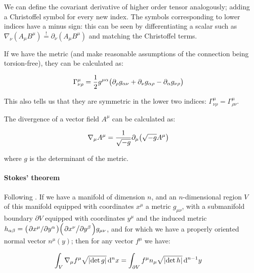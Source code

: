 \documentclass[main.tex]{subfiles}
\begin{document}
We can define the covariant derivative of higher order tensor analogously; adding a Christoffel symbol for every new index. The symbols corresponding to lower indices have a minus sign: this can be seen by differentiating a scalar such as \(\nabla_\nu (A_\mu B^\mu) \overset{!}{=}  \partial_\nu (A_\mu B^\mu)\) and matching the Christoffel terms.

If we have the metric (and make reasonable assumptions of the connection being torsion-free), they can be calculated as:

\begin{equation}
    \Gamma^\mu_{\nu \rho} = \frac{1}{2} g^{\mu \alpha} \qty(
    \partial_\rho g_{\alpha \nu} +
    \partial_\nu g_{\alpha \rho} -
    \partial_\alpha g_{\nu \rho}
    ) \label{eq:christoffel-symbols-from-metric}
\end{equation}

This also tells us that they are symmetric in the lower two indices: $\Gamma ^\mu _{\nu \rho} = \Gamma ^\mu _{\rho \nu}$.

The divergence of a vector field $A^\mu$ can be calculated as:

\begin{equation}
    \nabla_\mu A^\mu = \frac{1}{\sqrt{-g}}\partial_\mu \qty(\sqrt{-g}A^\mu) \label{eq:covariant-divergence}
\end{equation}

where $g$ is the determinant of the metric.


\paragraph{Stokes' theorem}

Following \cite[]{Unger:2016}.
If we have a manifold of dimension \(n\), and an \(n\)-dimensional region \(V\) of this manifold equipped with coordinates \(x^\mu\) a metric \(g_{\mu\nu}\), with a submanifold boundary \(\partial V\) equipped with coordinates \(y^\mu\) and the induced metric \(h_{\alpha\beta} = \qty(\pdv*{x^\mu}{y^\alpha}) \qty(\pdv*{x^\nu}{y^\beta}) g_{\mu\nu}\), and for which we have a properly oriented normal vector \(n^\mu (y)\); then for any vector \(f^\mu\) we have:

\begin{equation} \label{eq:stokes-theorem}
    \int _{V} \nabla_\mu f^\mu \sqrt{\abs{\det g}}  \dd[n]{x}  = \int _{\partial V} f^\mu  n_\mu \sqrt{\abs{\det h}} \dd[n-1]{y}
\end{equation}
\end{document}
